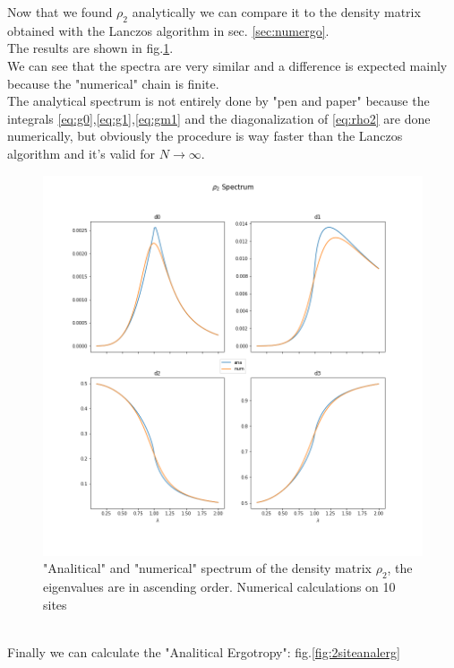 \documentclass[10pt,a4paper]{article}
\begin{document}
	Now that we found $\rho_2$ analytically we can compare it to the density matrix obtained with the Lanczos algorithm in sec. \ref{sec:numergo}.\\
	The results are shown in fig.\ref{fig:theoexpwick}.\\
	We can see that the spectra are very similar and a difference is expected mainly because the "numerical" chain is finite.\\
	The analytical spectrum is not entirely done by "pen and paper" because the integrals \ref{eq:g0},\ref{eq:g1},\ref{eq:gm1}  and the diagonalization of  \ref{eq:rho2}  are done numerically, but obviously the procedure is way faster than the Lanczos algorithm and it's valid for $N\rightarrow\infty$.
\begin{figure}[b]
		\centering
		\includegraphics[width=\linewidth]{ananumwick}
		\caption{"Analitical" and "numerical" spectrum of the density matrix $\rho_2$, the eigenvalues are in ascending order. Numerical calculations on 10 sites}
		\label{fig:theoexpwick}
\end{figure}\\
Finally we can calculate the "Analitical Ergotropy": fig.\ref{fig:2siteanalerg}
\end{document}
